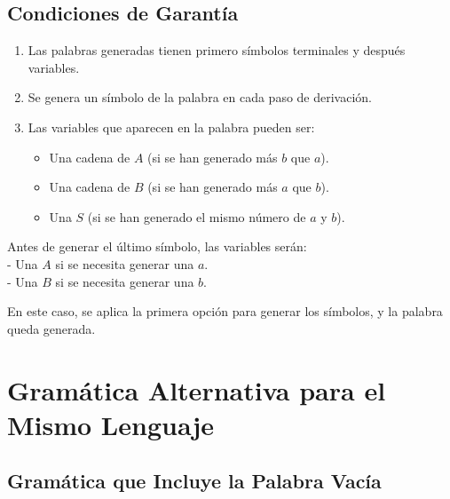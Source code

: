 \documentclass[12pt]{report} %
\providecommand{\tightlist}{%
  \setlength{\itemsep}{0pt}\setlength{\parskip}{0pt}}
\begin{document}
\hypertarget{condiciones-de-garantuxeda}{%
\subsection{Condiciones de Garantía}\label{condiciones-de-garantuxeda}}

\begin{enumerate}
\def\labelenumi{\arabic{enumi}.}
\tightlist
\item
  Las palabras generadas tienen primero símbolos terminales y después
  variables.\\
\item
  Se genera un símbolo de la palabra en cada paso de derivación.\\
\item
  Las variables que aparecen en la palabra pueden ser:

  \begin{itemize}
  \tightlist
  \item
    Una cadena de \(A\) (si se han generado más \(b\) que \(a\)).\\
  \item
    Una cadena de \(B\) (si se han generado más \(a\) que \(b\)).\\
  \item
    Una \(S\) (si se han generado el mismo número de \(a\) y \(b\)).
  \end{itemize}
\end{enumerate}

Antes de generar el último símbolo, las variables serán:\\
- Una \(A\) si se necesita generar una \(a\).\\
- Una \(B\) si se necesita generar una \(b\).

En este caso, se aplica la primera opción para generar los símbolos, y
la palabra queda generada.

\hypertarget{gramuxe1tica-alternativa-para-el-mismo-lenguaje}{%
\section{Gramática Alternativa para el Mismo
Lenguaje}\label{gramuxe1tica-alternativa-para-el-mismo-lenguaje}}

\hypertarget{gramuxe1tica-que-incluye-la-palabra-vacuxeda}{%
\subsection{Gramática que Incluye la Palabra
Vacía}\label{gramuxe1tica-que-incluye-la-palabra-vacuxeda}}
\end{document}
